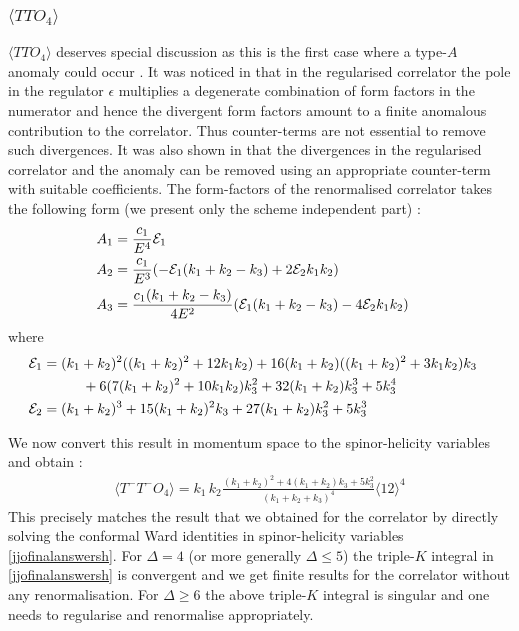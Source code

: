 \documentclass[a4paper,11pt]{article}
\begin{document}
\subsubsection{$\langle TTO_4\rangle$}
$\langle TTO_4\rangle$ deserves special discussion as this is the first case where a type-$A$ anomaly could occur \cite{Bzowski:2018fql}. It was noticed in \cite{Bzowski:2018fql} that in the regularised correlator the pole in the regulator $\epsilon$ multiplies a degenerate combination of form factors in the numerator and hence 
the divergent form factors amount to a finite anomalous contribution to the correlator. Thus counter-terms are not essential to remove such divergences. It was also shown in \cite{Bzowski:2018fql} that the divergences in the regularised correlator and the anomaly can be removed using an appropriate counter-term with suitable coefficients. The form-factors of the renormalised correlator takes the following form (we present only the scheme independent part) :
%
\begin{align}
A_1&=\frac{c_1}{E^4}\mathcal E_1\cr
A_2&=\frac{c_1}{E^3}(-\mathcal E_1(k_1+k_2-k_3)+2\mathcal E_2 k_1k_2)\cr
A_3&=\frac{c_1(k_1+k_2-k_3)}{4E^2}(\mathcal E_1(k_1+k_2-k_3)-4\mathcal E_2 k_1k_2)
\end{align}
%
where
%
\begin{align}
\mathcal E_1&=(k_1+k_2)^2((k_1+k_2)^2+12k_1k_2)+16(k_1+k_2)((k_1+k_2)^2+3k_1k_2)k_3\cr
&\hspace{1cm}+6(7(k_1+k_2)^2+10k_1k_2)k_3^2+32(k_1+k_2)k_3^3+5k_3^4\cr
\mathcal E_2&=(k_1+k_2)^3+15(k_1+k_2)^2k_3+27(k_1+k_2)k_3^2+5k_3^3
\end{align}
%


We now convert this result in momentum space to the spinor-helicity variables and obtain :
\begin{align}
\langle T^{-}T^{-}O_4\rangle=k_1\,k_2\frac{(k_1+k_2)^2+4(k_1+k_2)k_3+5k_3^2}{(k_1+k_2+k_3)^4}\langle 12\rangle^4
\end{align}
This precisely matches the result that we obtained for the correlator by directly solving the conformal Ward identities in spinor-helicity variables \eqref{jjofinalanswersh}.
%
For $\Delta=4$ (or more generally $\Delta\le 5$) the  triple-$K$ integral in \eqref{jjofinalanswersh} is convergent and we get finite results for the correlator without any renormalisation. For $\Delta\ge 6$ the above triple-$K$ integral is singular and one needs to regularise and renormalise appropriately. 
\end{document}
